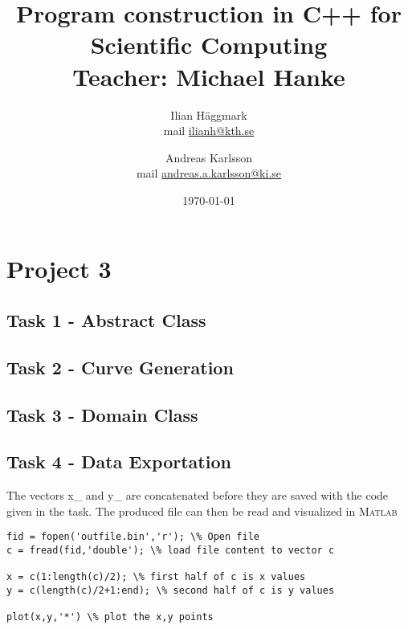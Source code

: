 \documentclass[paper=a4, fontsize=12pt]{article} %
\title{Program construction in C++ for Scientific Computing \\ Teacher: Michael Hanke}
\author{Ilian H{\"a}ggmark \\ mail \href{mailto:ilianh@kth.se}{ilianh@kth.se}
  \and Andreas Karlsson \\ mail \href{mailto:andreas.a.karlsson@ki.se}{andreas.a.karlsson@ki.se} }
\date{\normalsize\today} %
\begin{document}
\maketitle %

\section*{Project 3}
\subsection*{Task 1 - Abstract Class}





\subsection*{Task 2 - Curve Generation}

\subsection*{Task 3 - Domain Class}


\subsection*{Task 4 - Data Exportation}

The vectors x\_ and y\_ are concatenated before they are saved with the code given in the task. The produced file can then be read and visualized in \textsc{Matlab} 

\begin{lstlisting}
fid = fopen('outfile.bin','r'); \% Open file
c = fread(fid,'double'); \% load file content to vector c

x = c(1:length(c)/2); \% first half of c is x values
y = c(length(c)/2+1:end); \% second half of c is y values

plot(x,y,'*') \% plot the x,y points 
 \end{lstlisting}  
\end{document}
